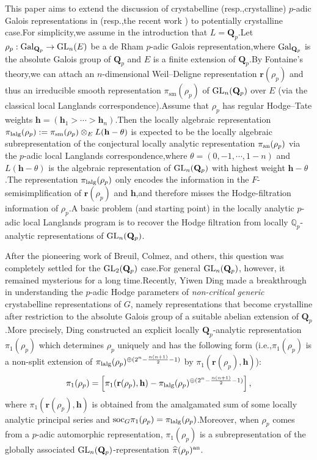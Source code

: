 \documentclass[10pt]{article}
\newcommand{\gal}{{\rm Gal}}
\newcommand{\GLN}{{\rm GL}}
\newcommand{\ana}{{\rm an}}
\newcommand{\soc}{{\rm soc}}
\newcommand{\wdre}{{\textbf{r}}}
\newcommand{\lalg}{{\rm lalg}}
\newcommand{\BQ}{{\mathbb{Q}}}
\newcommand{\bQ}{{\mathbf{Q}}}
\newcommand{\bh}{{\mathbf{h}}}
\begin{document}
This paper aims to extend the discussion of crystabelline (resp.,\;crystalline) $p$-adic Galois representations in \cite{ParaDing2024} (resp.,\;the recent work \cite{BDcritical25}) to potentially crystalline case.\;For simplicity,\;we assume in the introduction that $L=\bQ_p$.\;Let $\rho_p:\gal_{\bQ_p}\rightarrow \GLN_n(E)$ be a de Rham $p$-adic Galois representation,\;where $\gal_{\bQ_p}$ is the absolute Galois group of $\bQ_p$ and $E$ is a finite extension of $\bQ_p$.\;By Fontaine's theory,\;we can attach an $n$-dimensional Weil--Deligne representation $\wdre(\rho_p)$ and thus an irreducible smooth representation $\pi_{\mathrm{sm}}(\rho_p)$ of $\GLN_n(\bQ_p)$ over $E$ (via the classical local Langlands correspondence).\;Assume that $\rho_p$ has regular Hodge--Tate weights $\bh=(\bh_1>\cdots>\bh_n)$.\;Then the locally algebraic representation $\pi_{\lalg}(\rho_p):=\pi_{\mathrm{sm}}(\rho_p)\otimes_EL(\bh-\theta)$ is expected to be the locally algebraic subrepresentation of the conjectural locally analytic representation $\pi_{\ana}(\rho_p)$ via the $p$-adic local Langlands correspondence,\;where $\theta=(0,-1,\cdots,1-n)$ and $L(\bh-\theta)$ is the algebraic representation of $\GLN_n(\bQ_p)$ with highest weight $\bh-\theta$.\;The representation $\pi_{\lalg}(\rho_p)$ only encodes the information in the $F$-semisimplification of $\wdre(\rho_p)$ and $\bh$,\;and therefore misses the Hodge-filtration information of $\rho_p$.\;A basic problem (and starting point) in the locally analytic $p$-adic local Langlands program is to recover the Hodge filtration from locally ${\BQ}_p$-analytic representations of $\GLN_n({\bQ}_p)$.\;

After the pioneering work of Breuil, Colmez, and others, this question was completely settled for the $\GLN_2(\bQ_p)$ case.\;For general $\GLN_n(\bQ_p)$, however, it remained mysterious for a long time.\;Recently, Yiwen Ding made a breakthrough in understanding the $p$-adic Hodge parameters of \textit{non-critical generic} crystabelline representations of $G$, namely representations that become crystalline after restriction to the absolute Galois group of a suitable abelian extension of $\bQ_p$ \cite{ParaDing2024}.\;More precisely, Ding constructed an explicit locally $\bQ_p$-analytic representation $\pi_{1}(\rho_p)$ which determines $\rho_p$ uniquely and has the following form (i.e.,\;$\pi_1(\rho_p)$ is a non-split extension of $\pi_{\lalg}(\rho_p)^{\oplus(2^n-\frac{n(n+1)}{2}-1)}$ by $\pi_1(\wdre(\rho_p),\bh)$):
\[\pi_1(\rho_p)=\left[\pi_1(\wdre(\rho_p),\bh)-\pi_{\lalg}(\rho_p)^{\oplus(2^n-\frac{n(n+1)}{2}-1)}\right],\]
where $\pi_1(\wdre(\rho_p),\bh)$ is obtained from the amalgamated sum of some locally analytic principal series and $\soc_{G}\pi_1(\rho_p)=\pi_{\lalg}(\rho_p)$.\;Moreover, when $\rho_p$ comes from a $p$-adic automorphic representation, $\pi_{1}(\rho_p)$ is a subrepresentation of the globally associated $\GLN_n(\bQ_p)$-representation $\widehat{\pi}(\rho_p)^{\ana}$.\;
\end{document}
